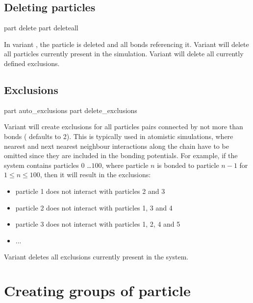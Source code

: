 \subsection{Deleting  particles}
\label{tcl:part:delete}

\begin{essyntax}
   part  delete
   part deleteall
\end{essyntax}

In variant , the particle  is deleted
and all bonds referencing it.  Variant  will delete all
particles currently present in the simulation. Variant 
will delete all currently defined exclusions.

\subsection{Exclusions}

\begin{essyntax}
   part auto\_exclusions 
   part delete\_exclusions
  \begin{features}
  \end{features}
\end{essyntax}


Variant  will create exclusions for all particles pairs
connected by not more than  bonds ( defaults to
2). This is typically used in atomistic simulations, where nearest and
next nearest neighbour interactions along the chain have to be omitted
since they are included in the bonding potentials. For example, if the
system contains particles $0$ \dots $100$, where particle $n$ is
bonded to particle $n-1$ for $1 \leq n \leq 100$, then it will result
in the exclusions:
\begin{itemize}
  \item particle 1 does not interact with particles 2 and 3
  \item particle 2 does not interact with particles 1, 3 and 4
  \item particle 3 does not interact with particles 1, 2, 4 and 5
  \item ...
\end{itemize}

Variant  deletes all exclusions currently present in the
system.

\section{Creating groups of particle}

